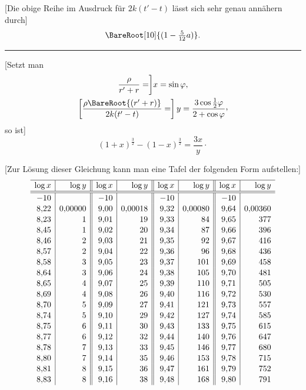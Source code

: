 [Die obige Reihe im Ausdruck für \(2k(t'-t)\) lässt sich sehr genau annähern durch]
\[
\BareRoot[10]{(1-\tfrac5{12}a)}.
\]
\begin{center}\rule{.3\linewidth}{.4pt}\end{center}

[Setzt man
\[
\begin{gathered}
\frac{\rho}{r'+r}=\biggr]x=\sin\varphi,\\
\left[\frac{\rho\BareRoot{(r'+r)}}{2k(t'-t)}=\right]y=\frac{3\cos\tfrac12\varphi}{2+\cos\varphi}\mathpunct{\raisebox{.45ex}{,}}
\end{gathered}
\]
so ist]
\[
(1+x)^{\frac32}-(1-x)^{\frac32}=\frac{3x}y\mathpunct{\cdot}
\]

[Zur Lösung dieser Gleichung kann man eine Tafel der folgenden Form aufstellen:]
\[
\setlength{\arraycolsep}{5pt}
\renewcommand{\arraystretch}{1.08}
\begin{array}{r|r||r|r||r|r||r|r}
\hline
\log x&\log y&\log x&\log y&\log x&\log y&\log x&\log y\\
\hline\hline
-10&&-10&&-10&&-10&\\
8{,}22&0{,}00000&9{,}00&0{,}00018&9{,}32&0{,}00080&9{,}64&0{,}00360\\
8{,}23&1&9{,}01&19&9{,}33&84&9{,}65&377\\
8{,}45&1&9{,}02&20&9{,}34&87&9{,}66&396\\
8{,}46&2&9{,}03&21&9{,}35&92&9{,}67&416\\
8{,}57&2&9{,}04&22&9{,}36&96&9{,}68&436\\
8{,}58&3&9{,}05&23&9{,}37&101&9{,}69&458\\
8{,}64&3&9{,}06&24&9{,}38&105&9{,}70&481\\
8{,}65&4&9{,}07&25&9{,}39&110&9{,}71&505\\
8{,}69&4&9{,}08&26&9{,}40&116&9{,}72&530\\
8{,}70&5&9{,}09&27&9{,}41&121&9{,}73&557\\
8{,}74&5&9{,}10&29&9{,}42&127&9{,}74&585\\
8{,}75&6&9{,}11&30&9{,}43&133&9{,}75&615\\
8{,}77&6&9{,}12&32&9{,}44&140&9{,}76&647\\
8{,}78&7&9{,}13&33&9{,}45&146&9{,}77&680\\
8{,}80&7&9{,}14&35&9{,}46&153&9{,}78&715\\
8{,}81&8&9{,}15&36&9{,}47&161&9{,}79&752\\
8{,}83&8&9{,}16&38&9{,}48&168&9{,}80&791\\

\end{array}\]
